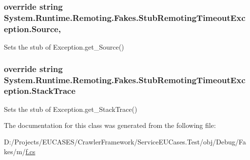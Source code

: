 \hypertarget{class_system_1_1_runtime_1_1_remoting_1_1_fakes_1_1_stub_remoting_timeout_exception_a5cd257e96f4f893410f67e610e43f48d}{
\subsubsection[{Source}]{\setlength{\rightskip}{0pt plus 5cm}override string System.\-Runtime.\-Remoting.\-Fakes.\-Stub\-Remoting\-Timeout\-Exception.\-Source\hspace{0.3cm}{\ttfamily [get]}, {\ttfamily [set]}}}\label{class_system_1_1_runtime_1_1_remoting_1_1_fakes_1_1_stub_remoting_timeout_exception_a5cd257e96f4f893410f67e610e43f48d}


Sets the stub of Exception.\-get\-\_\-\-Source()

\hypertarget{class_system_1_1_runtime_1_1_remoting_1_1_fakes_1_1_stub_remoting_timeout_exception_ab3557aaa0ae39fa490d44c42e0d83a88}{
\subsubsection[{Stack\-Trace}]{\setlength{\rightskip}{0pt plus 5cm}override string System.\-Runtime.\-Remoting.\-Fakes.\-Stub\-Remoting\-Timeout\-Exception.\-Stack\-Trace\hspace{0.3cm}{\ttfamily [get]}}}\label{class_system_1_1_runtime_1_1_remoting_1_1_fakes_1_1_stub_remoting_timeout_exception_ab3557aaa0ae39fa490d44c42e0d83a88}


Sets the stub of Exception.\-get\-\_\-\-Stack\-Trace()



The documentation for this class was generated from the following file\-:\begin{DoxyCompactItemize}
\item 
D\-:/\-Projects/\-E\-U\-C\-A\-S\-E\-S/\-Crawler\-Framework/\-Service\-E\-U\-Cases.\-Test/obj/\-Debug/\-Fakes/m/\hyperlink{m_2f_8cs}{f.\-cs}\end{DoxyCompactItemize}
